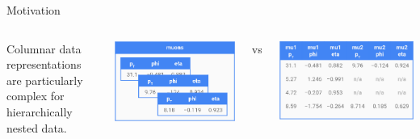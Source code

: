 \documentclass[aspectratio=169]{beamer}
\begin{document}
\begin{frame}[fragile]{Motivation}
\vspace{0.5 cm}
\begin{columns}
Columnar data representations are particularly complex for hierarchically nested data.

\vspace{0.25 cm}
\begin{columns}
\includegraphics[width=\linewidth]{muons-as-objects.png}

\centering vs

\includegraphics[width=\linewidth]{muons-as-a-table.png}
\end{columns}


\end{columns}
\end{frame}
\end{document}
